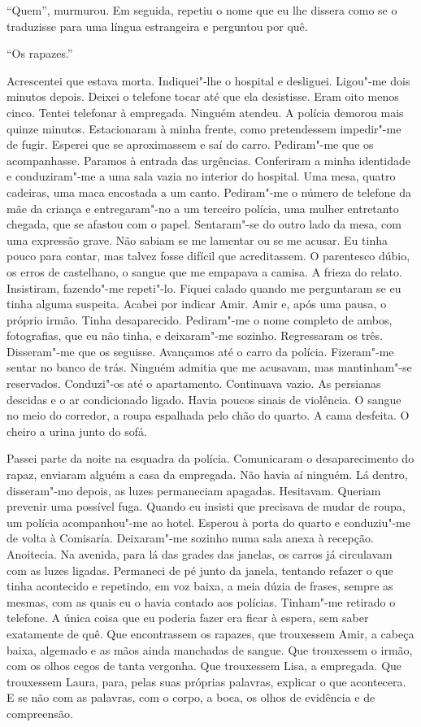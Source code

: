 ``Quem'',
murmurou. Em seguida, repetiu o nome que eu lhe dissera como se o
traduzisse para uma língua estrangeira e perguntou por quê.

``Os rapazes.''

Acrescentei que estava morta. Indiquei"-lhe o hospital e desliguei.
Ligou"-me dois minutos depois. Deixei o telefone tocar até que ela
desistisse. Eram oito menos cinco. Tentei telefonar à empregada. Ninguém
atendeu. A polícia demorou mais quinze minutos. Estacionaram à minha
frente, como pretendessem impedir"-me de fugir. Esperei que se
aproximassem e saí do carro. Pediram"-me que os acompanhasse. Paramos à
entrada das urgências. Conferiram a minha identidade e conduziram"-me a
uma sala vazia no interior do hospital. Uma mesa, quatro cadeiras, uma
maca encostada a um canto. Pediram"-me o número de telefone da mãe da
criança e entregaram"-no a um terceiro polícia, uma mulher entretanto
chegada, que se afastou com o papel. Sentaram"-se do outro lado da mesa,
com uma expressão grave. Não sabiam se me lamentar ou se me acusar. Eu
tinha pouco para contar, mas talvez fosse difícil que acreditassem. O
parentesco dúbio, os erros de castelhano, o sangue que me empapava a
camisa. A frieza do relato. Insistiram, fazendo"-me repeti"-lo. Fiquei
calado quando me perguntaram se eu tinha alguma suspeita. Acabei por
indicar Amir. Amir e, após uma pausa, o próprio irmão. Tinha
desaparecido. Pediram"-me o nome completo de ambos, fotografias, que eu
não tinha, e deixaram"-me sozinho. Regressaram os três. Disseram"-me que
os seguisse. Avançamos até o carro da polícia. Fizeram"-me sentar no
banco de trás. Ninguém admitia que me acusavam, mas mantinham"-se
reservados. Conduzi"-os até o apartamento. Continuava vazio. As persianas
descidas e o ar condicionado ligado. Havia poucos sinais de violência. O
sangue no meio do corredor, a roupa espalhada pelo chão do quarto. A
cama desfeita. O cheiro a urina junto do sofá.

Passei parte da noite na esquadra da polícia. Comunicaram o
desaparecimento do rapaz, enviaram alguém a casa da empregada. Não havia
aí ninguém. Lá dentro, disseram"-mo depois, as luzes permaneciam
apagadas. Hesitavam. Queriam prevenir uma possível fuga. Quando eu
insisti que precisava de mudar de roupa, um polícia acompanhou"-me ao
hotel. Esperou à porta do quarto e conduziu"-me de volta à Comisaría.
Deixaram"-me sozinho numa sala anexa à recepção. Anoitecia. Na avenida,
para lá das grades das janelas, os carros já circulavam com as luzes
ligadas. Permaneci de pé junto da janela, tentando refazer o que tinha
acontecido e repetindo, em voz baixa, a meia dúzia de frases, sempre as
mesmas, com as quais eu o havia contado aos polícias. Tinham"-me
retirado o telefone. A única coisa que eu poderia fazer era ficar à
espera, sem saber exatamente de quê. Que encontrassem os rapazes, que
trouxessem Amir, a cabeça baixa, algemado e as mãos ainda manchadas de
sangue. Que trouxessem o irmão, com os olhos cegos de tanta vergonha.
Que trouxessem Lisa, a empregada. Que trouxessem Laura, para, pelas suas
próprias palavras, explicar o que acontecera. E se não com as palavras,
com o corpo, a boca, os olhos de evidência e de compreensão.

